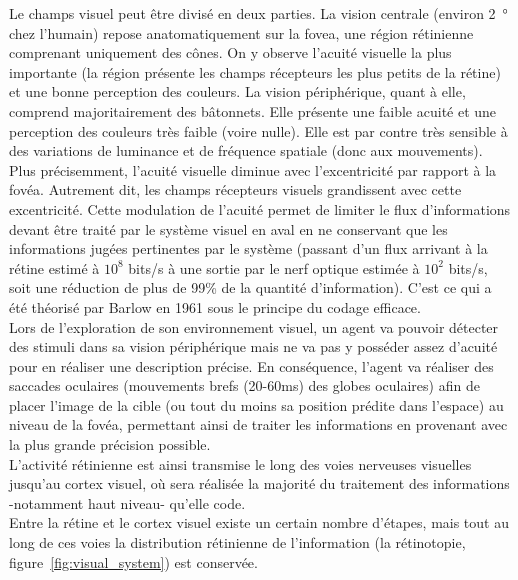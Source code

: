 Le champs visuel peut être divisé en deux parties. La vision centrale (environ \SI{2}{\degree} chez l'humain) repose anatomatiquement sur la fovea, une région rétinienne comprenant uniquement des cônes. On y observe l'acuité visuelle la plus importante (la région présente les champs récepteurs les plus petits de la rétine) et une bonne perception des couleurs.
La vision périphérique, quant à elle, comprend majoritairement des bâtonnets. Elle présente une faible acuité et une perception des couleurs très faible (voire nulle). Elle est par contre très sensible à des variations de luminance et de fréquence spatiale (donc aux mouvements).
 Plus précisemment, l'acuité visuelle diminue avec l'excentricité par rapport à la fovéa. Autrement dit, les champs récepteurs visuels grandissent avec cette excentricité. Cette modulation de l'acuité permet de limiter le flux d'informations devant être traité par le système visuel en aval en ne conservant que les informations jugées pertinentes par le système (passant d'un flux arrivant à la rétine estimé à $10^8$ bits/s à une sortie par le nerf optique estimée à $10^2$ bits/s, soit une réduction de plus de 99\% de la quantité d'information). C'est ce qui a été théorisé par Barlow en 1961 sous le principe du codage efficace. \autocite{Itti2000, Kortum1996, Werner2014, Zhaoping2014}\\
Lors de l'exploration de son environnement visuel, un agent va pouvoir détecter des stimuli dans sa vision périphérique mais ne va pas y posséder assez d'acuité pour en réaliser une description précise.
En conséquence, l'agent va réaliser des saccades oculaires (mouvements brefs (20-60\si{\milli\second}) des globes oculaires) afin de placer l'image de la cible (ou tout du moins sa position prédite dans l'espace) au niveau de la fovéa, permettant ainsi de traiter les informations en provenant avec la plus grande précision possible.\autocite{Kortum1996, Werner2014}\\
L'activité rétinienne est ainsi transmise le long des voies nerveuses visuelles jusqu'au cortex visuel, où sera réalisée la majorité du traitement des informations -notamment haut niveau- qu'elle code.\autocite{Werner2014} \\
Entre la rétine et le cortex visuel existe un certain nombre d'étapes, mais tout au long de ces voies la distribution rétinienne de l'information (la rétinotopie, figure~\ref{fig:visual_system}) est conservée.\autocite{Werner2014}\\

